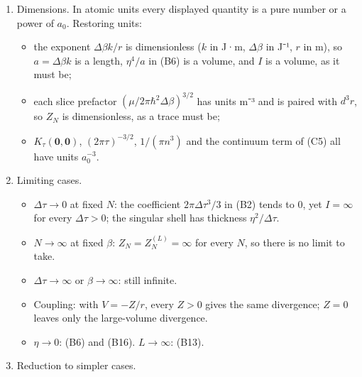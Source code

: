 \documentclass[11pt,a4paper]{article}
\providecommand{\tightlist}{\setlength{\itemsep}{0pt}\setlength{\parskip}{0pt}}
\begin{document}
\begin{enumerate}
\def\labelenumi{\arabic{enumi}.}
\tightlist
\item
  Dimensions. In atomic units every displayed quantity is a pure number or a power of \(a_0\). Restoring units:

  \begin{itemize}
  \tightlist
  \item
    the exponent \(\Delta\beta k/r\) is dimensionless (\(k\) in J·m, \(\Delta\beta\) in J⁻¹, \(r\) in m), so \(a=\Delta\beta k\) is a length, \(\eta^4/a\) in (B6) is a volume, and \(I\) is a volume, as it must be;
  \item
    each slice prefactor \((\mu/2\pi\hbar^2\Delta\beta)^{3/2}\) has units m⁻³ and is paired with \(d^3r\), so \(Z_N\) is dimensionless, as a trace must be;
  \item
    \(K_\tau(\mathbf 0,\mathbf 0)\), \((2\pi\tau)^{-3/2}\), \(1/(\pi n^3)\) and the continuum term of (C5) all have units \(a_0^{-3}\).
  \end{itemize}
\item
  Limiting cases.

  \begin{itemize}
  \tightlist
  \item
    \(\Delta\tau\to0\) at fixed \(N\): the coefficient \(2\pi\Delta\tau^3/3\) in (B2) tends to 0, yet \(I=\infty\) for every \(\Delta\tau>0\); the singular shell has thickness \(\eta^2/\Delta\tau\).
  \item
    \(N\to\infty\) at fixed \(\beta\): \(Z_N=Z_N^{(L)}=\infty\) for every \(N\), so there is no limit to take.
  \item
    \(\Delta\tau\to\infty\) or \(\beta\to\infty\): still infinite.
  \item
    Coupling: with \(V=-Z/r\), every \(Z>0\) gives the same divergence; \(Z=0\) leaves only the large-volume divergence.
  \item
    \(\eta\to0\): (B6) and (B16). \(L\to\infty\): (B13).
  \end{itemize}
\item
  Reduction to simpler cases.


\end{enumerate}
\end{document}
